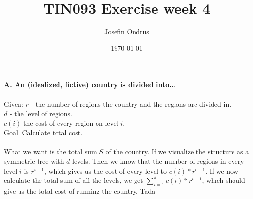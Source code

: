 \documentclass[12pt,oneside,reqno]{amsart}
\begin{document}
\setlength{\parindent}{6pt}
\def\code#1{\texttt{#1}} %

\title{TIN093 Exercise week 4}
\author{Josefin Ondrus}
\date{\today}
\maketitle

\textbf{A. An (idealized, fictive) country is divided into...}\\\\
Given: $r$ - the number of regions the country and the regions are divided in.\\
$d$ - the level of regions.\\
$c(i)$ the cost of every region on level $i$.\\
Goal: Calculate total cost.\\\\
What we want is the total sum $S$ of the country. If we visualize the structure as a symmetric tree with $d$ levels. Then we know that the number of regions in every level $i$ is $r^{i-1}$, which gives us the cost of every level to $c(i)*r^{i-1}$. If we now calculate the total sum of all the levels, we get $\sum_{i=1}^{d}c(i)*r^{i-1}$, which should give us the total cost of running the country. Tada!\\\\
\end{document}
